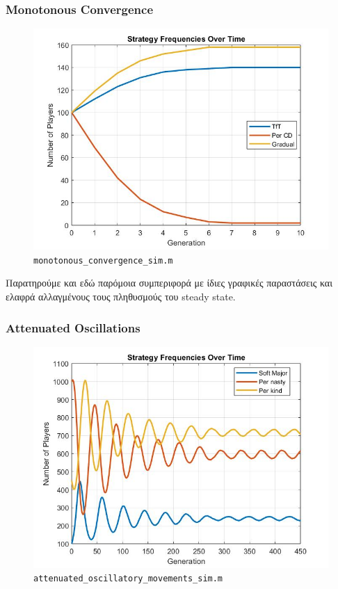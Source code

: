 \subsubsection{Monotonous Convergence}
\begin{figure}[th!]
\centering
\includegraphics[width=0.7\linewidth]{fit_plots_simulations/monotonous_convergence_sim}
\caption{\texttt{monotonous\_convergence\_sim.m}}
\label{fig:monotonousconvergencesim}
\end{figure}

Παρατηρούμε και εδώ παρόμοια συμπεριφορά με ίδιες γραφικές παραστάσεις και ελαφρά αλλαγμένους τους πληθυσμούς του steady state.


\subsubsection{Attenuated Oscillations}
\begin{figure}[th!]
\centering
\includegraphics[width=0.7\linewidth]{fit_plots_simulations/attenuated_oscillatory_movements_sim}
\caption{\texttt{attenuated\_oscillatory\_movements\_sim.m}}
\label{fig:attenuatedoscillatorymovementssim}
\end{figure}

